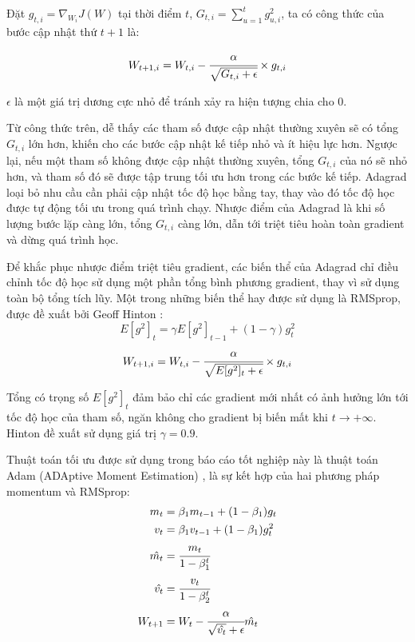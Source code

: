 \documentclass[12pt]{extreport}
\begin{document}
Đặt $ g_{t, i} = \nabla_{W_i} J(W) $ tại thời điểm $ t $, $ G_{t, i} = \sum_{u = 1}^{t} g_{u, i}^2 $, ta có công thức của bước cập nhật thứ $ t + 1 $ là:

$$ W_{t + 1, i} = W_{t, i} - \cfrac{\alpha}{\sqrt{G_{t, i} + \epsilon}} \times g_{t, i}  $$

$ \epsilon $ là một giá trị dương cực nhỏ để tránh xảy ra hiện tượng chia cho 0.

Từ công thức trên, dễ thấy các tham số được cập nhật thường xuyên sẽ có tổng $ G_{t, i} $ lớn hơn, khiến cho các bước cập nhật kế tiếp nhỏ và ít hiệu lực hơn. Ngược lại, nếu một tham số không được cập nhật thường xuyên, tổng $ G_{t, i} $ của nó sẽ nhỏ hơn, và tham số đó sẽ được tập trung tối ưu hơn trong các bước kế tiếp. Adagrad loại bỏ nhu cầu cần phải cập nhật tốc độ học bằng tay, thay vào đó tốc độ học được tự động tối ưu trong quá trình chạy. Nhược điểm của Adagrad là khi số lượng bước lặp càng lớn, tổng $ G_{t, i} $ càng lớn, dẫn tới triệt tiêu hoàn toàn gradient và dừng quá trình học.

Để khắc phục nhược điểm triệt tiêu gradient, các biến thể của Adagrad chỉ điều chỉnh tốc độ học sử dụng một phần tổng bình phương gradient, thay vì sử dụng toàn bộ tổng tích lũy. Một trong những biến thể hay được sử dụng là RMSprop, được đề xuất bởi Geoff Hinton \cite{slides_on_cs231n}:
$$ E[g^2]_t = \gamma E[g^2]_{t - 1} + (1 - \gamma) g_t^2 $$
$$ W_{t + 1, i} = W_{t, i} - \cfrac{\alpha}{\sqrt{E[g^2]_t + \epsilon}} \times g_{t, i} $$

Tổng có trọng số $ E[g^2]_t $ đảm bảo chỉ các gradient mới nhất có ảnh hưởng lớn tới tốc độ học của tham số, ngăn không cho gradient bị biến mất khi $ t \to +\infty $. Hinton đề xuất sử dụng giá trị $ \gamma = 0.9 $.

Thuật toán tối ưu được sử dụng trong báo cáo tốt nghiệp này là thuật toán Adam (ADAptive Moment Estimation) \cite{kingma2017adam}, là sự kết hợp của hai phương pháp momentum và RMSprop:
\begin{align*}
    m_t       & = \beta_1m_{t - 1} + (1 - \beta_1) g_t                        \\
    v_t       & = \beta_1v_{t - 1} + (1 - \beta_1) g_t^2                      \\
    \hat{m_t} & = \cfrac{m_t}{1 - \beta_1^t}                                  \\
    \hat{v_t} & = \cfrac{v_t}{1 - \beta_2^t}                                  \\
    W_{t + 1} & = W_t - \cfrac{\alpha}{\sqrt{\hat{v_t}} + \epsilon} \hat{m_t}
\end{align*}
\end{document}
